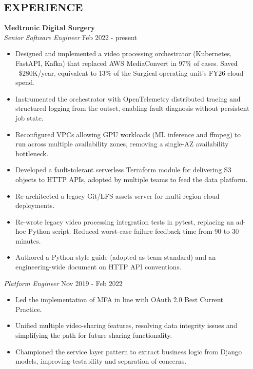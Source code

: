 \documentclass[line,margin]{res}
\begin{document}
\begin{resume}
\section{EXPERIENCE} \textbf{Medtronic Digital Surgery} \\
                {\sl Senior Software Engineer} \hfill   Feb 2022 - present \\
                 \begin{itemize}
                   \item Designed and implemented a video processing orchestrator (Kubernetes, FastAPI, Kafka)
                         that replaced AWS MediaConvert in 97\% of cases. Saved ~\$280K/year, equivalent to 13\%
                         of the Surgical operating unit's FY26 cloud spend.
                   \item Instrumented the orchestrator with OpenTelemetry distributed tracing and structured logging
                         from the outset, enabling fault diagnosis without persistent job state.
                   \item Reconfigured VPCs allowing GPU workloads (ML inference and ffmpeg) to run across multiple
                         availability zones, removing a single-AZ availability bottleneck.
                   \item Developed a fault-tolerant serverless Terraform module for delivering S3 objects to HTTP APIs,
                         adopted by multiple teams to feed the data platform.
                   \item Re-architected a legacy Git/LFS assets server for multi-region cloud deployments.
                   \item Re-wrote legacy video processing integration tests in pytest, replacing an ad-hoc Python script.
                         Reduced worst-case failure feedback time from 90 to 30 minutes.
                   \item Authored a Python style guide (adopted as team standard)
                         and an engineering-wide document on HTTP API conventions.
                 \end{itemize}
                {\sl Platform Engineer} \hfill          Nov 2019 - Feb 2022 \\
                  \begin{itemize}
                  \item Led the implementation of MFA in line with OAuth 2.0 Best Current Practice.
                  \item Unified multiple video-sharing features, resolving data integrity issues
                        and simplifying the path for future sharing functionality.
                  \item Championed the service layer pattern to extract business logic from Django models,
                        improving testability and separation of concerns.
                  \end{itemize}


\end{resume}
\end{document}
